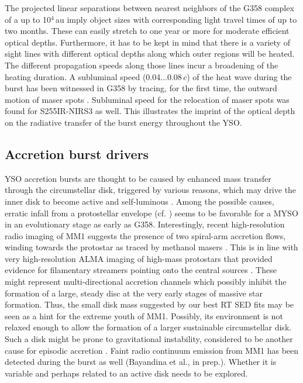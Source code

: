 The projected linear separations between nearest neighbors of the G358 complex of a up to 10$^4$\,au \citep{2019ApJ...881L..39B} imply object sizes with corresponding light travel times of up to two months. These can easily stretch to one year or more for moderate efficient optical depths. Furthermore, it has to be kept in mind that there is a variety of sight lines with different optical depths along which outer regions will be heated. The different propagation speeds along those lines incur a broadening of the heating duration. A subluminal speed  (0.04$\dots0.08\,c$) of the heat wave during the burst has been witnessed in G358 by tracing, for the first time, the outward motion of maser spots \citep{2020NatAs...4..506B}. Subluminal speed for the relocation of maser spots was found for S255IR-NIRS3 \citep{2018IAUS..336...37S} as well. This illustrates the imprint of the optical depth on the radiative transfer of the burst energy throughout the YSO.


\subsection{Accretion burst drivers}

YSO accretion bursts are thought to be caused by enhanced mass transfer through the circumstellar disk, triggered by various reasons, which may drive the inner disk to become active and self-luminous \citep{1996ARA&A..34..207H}. Among the possible causes, erratic infall from a protostellar envelope (cf. \citealp{2015ApJ...805..115V, 2017MNRAS.464L..90M})  seems to be favorable for a MYSO in an evolutionary stage as early as G358. Interestingly, recent high-resolution radio imaging of MM1 suggests the presence of two spiral-arm accretion flows, winding towards the protostar as traced by methanol masers \citep{2019ApJ...881L..39B, 2020NatAs.tmp..144C}. This is in line with very high-resolution ALMA imaging of high-mass protostars that provided evidence for filamentary streamers pointing onto the central sources \citep{2018arXiv180505364G, 2020A&A...634L..11J}. These might represent multi-directional accretion channels which possibly inhibit the formation of a large, steady disc at the very early stages of massive star formation. Thus, the small disk mass suggested by our best RT SED fits may be seen as a hint for the extreme youth of MM1. Possibly, its environment is not relaxed enough to allow the formation of a larger sustainable circumstellar disk. Such a disk might be prone to gravitational instability, considered to be another cause for episodic accretion \citep{2015ApJ...805..115V}. 
Faint radio continuum emission from MM1 has been detected during the burst as well (Bayandina et al., in prep.). Whether it is variable and perhaps related to an active disk needs to be explored.

